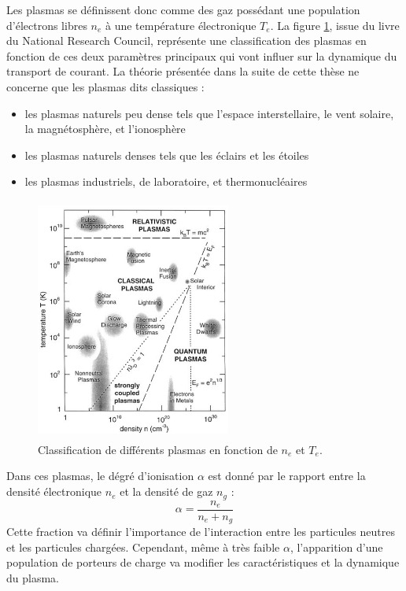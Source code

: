 			Les plasmas se définissent donc comme des gaz possédant une population
			d'électrons libres $n_e$ à une température électronique $T_e$. 
			La figure \ref{zoologie}, issue du livre du National
			Research Council\cite{national1995Plasma}, représente une classification des
			plasmas en fonction de ces deux paramètres principaux qui vont influer sur la dynamique du transport de courant.
			La théorie présentée dans la suite de cette thèse ne concerne que les plasmas
			dits classiques :
			\begin{itemize}
			  \item les plasmas naturels peu dense tels que l'espace interstellaire,
			  le vent solaire, la magnétosphère, et l'ionosphère
			  \item les plasmas naturels denses tels que les éclairs et les étoiles
			  \item les plasmas industriels, de laboratoire, et thermonucléaires
			\end{itemize}
			\begin{figure}[htbp]
				\centering
				\includegraphics[height=80mm,width=64mm]{figures/zoologie.png}{\caption{Classification
				de différents plasmas en fonction de $n_e$ et $T_e$.}\label{zoologie}}
			\end{figure}
			
			Dans ces plasmas, le dégré d'ionisation $\alpha$ est donné par le rapport
			entre la densité électronique $n_e$ et la densité de gaz $n_g$ :
				$$\alpha=\frac{n_e}{n_e+n_g}$$
			Cette fraction va définir l'importance de l'interaction entre les particules 
			neutres et les particules chargées. Cependant, même à très faible $\alpha$,
			l'apparition d'une population de porteurs de charge va modifier les caractéristiques et la
			dynamique du plasma. 
			
